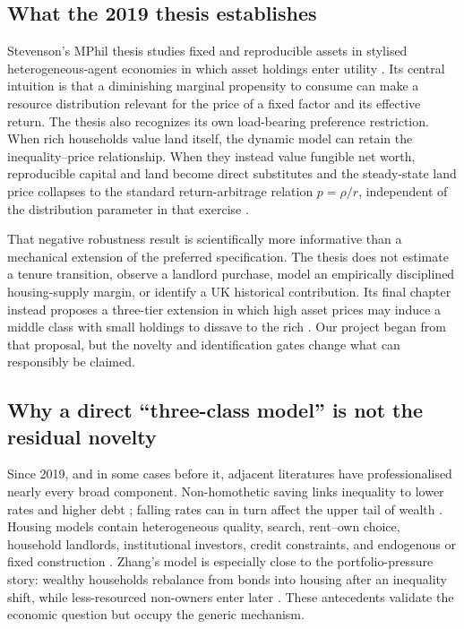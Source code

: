 \documentclass[11pt]{article}
\begin{document}
\subsection{What the 2019 thesis establishes}

Stevenson's MPhil thesis studies fixed and reproducible assets in stylised
heterogeneous-agent economies in which asset holdings enter utility
\citep{stevenson2019}. Its central intuition is that a diminishing marginal
propensity to consume can make a resource distribution relevant for the price of
a fixed factor and its effective return. The thesis also recognizes its own
load-bearing preference restriction. When rich households value land itself, the
dynamic model can retain the inequality--price relationship. When they instead
value fungible net worth, reproducible capital and land become direct substitutes
and the steady-state land price collapses to the standard return-arbitrage relation
$p=\rho/r$, independent of the distribution parameter in that exercise
\citep[pp.~48--49]{stevenson2019}.

That negative robustness result is scientifically more informative than a
mechanical extension of the preferred specification. The thesis does not estimate
a tenure transition, observe a landlord purchase, model an empirically disciplined
housing-supply margin, or identify a UK historical contribution. Its final chapter
instead proposes a three-tier extension in which high asset prices may induce a
middle class with small holdings to dissave to the rich
\citep[pp.~61--62]{stevenson2019}. Our project began from
that proposal, but the novelty and identification gates change what can responsibly
be claimed.

\subsection{Why a direct ``three-class model'' is not the residual novelty}

Since 2019, and in some cases before it, adjacent literatures have professionalised
nearly every broad component. Non-homothetic saving links inequality to lower
rates and higher debt \citep{mian2021}; falling rates can in turn affect the upper
tail of wealth \citep{gomez2024}. Housing models contain heterogeneous quality,
search, rent--own choice, household landlords, institutional investors, credit
constraints, and endogenous or fixed construction
\citep{head2023,greenwald2024,cima2026}. Zhang's model is especially close to the
portfolio-pressure story: wealthy households rebalance from bonds into housing
after an inequality shift, while less-resourced non-owners enter later
\citep{zhang2015}. These antecedents validate the economic question but occupy the
generic mechanism.
\end{document}
